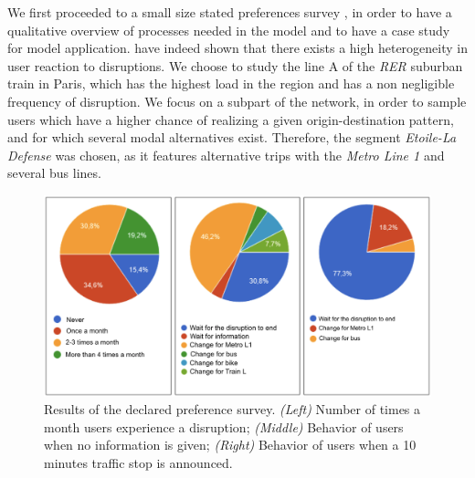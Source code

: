 \documentclass[3p,times,procedia]{elsarticle}
\begin{document}


We first proceeded to a small size stated preferences survey %
, in order to have a qualitative overview of processes needed in the model and to have a case study for model application. \cite{martin2016strategies} have indeed shown that there exists a high heterogeneity in user reaction to disruptions. We choose to study the line A of the \emph{RER} suburban train in Paris, which has the highest load in the region and has a non negligible frequency of disruption. We focus on a subpart of the network, in order to sample users which have a higher chance of realizing a given origin-destination pattern, and for which several modal alternatives exist. Therefore, the segment \emph{Etoile-La Defense} was chosen, as it features alternative trips with the \emph{Metro Line 1} and several bus lines.


\begin{figure}[t]\vspace*{4pt}
\centerline{\includegraphics[width=0.45\linewidth]{figures/Fig1.png}}
\caption{Results of the declared preference survey. \textit{(Left)} Number of times a month users experience a disruption; \textit{(Middle)} Behavior of users when no information is given; \textit{(Right)} Behavior of users when a 10 minutes traffic stop is announced.\label{fig:fig1}}
\end{figure}
\end{document}
